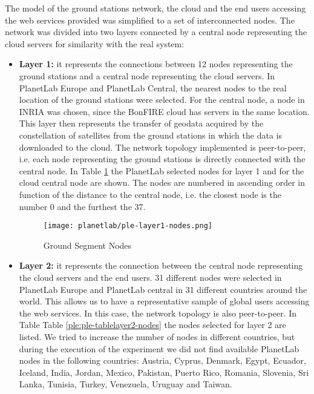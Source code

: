 The model of the ground stations network, the cloud and the end users accessing
the web services provided was simplified to a set of interconnected nodes. The
network was divided into two layers connected by a central node representing the
cloud servers for similarity with the real system: 
\begin{itemize}

\item \textbf{Layer 1:} it represents the connections between 12 nodes
  representing the ground stations and a central node representing the cloud
  servers. In PlanetLab Europe and PlanetLab Central, the nearest nodes to the
  real location of the ground stations were selected. For the central node, a
  node in INRIA was chosen, since the BonFIRE cloud has servers in the same
  location. This layer then represents the transfer of geodata acquired by the
  constellation of satellites from the ground stations in which the data is
  downloaded to the cloud. The network topology implemented is peer-to-peer,
  i.e. each node representing the ground stations is directly connected with the
  central node. In Table \ref{fig:ple-tablelayer1-nodes} the PlanetLab selected nodes for layer 1 and for the
  cloud central node are shown. The nodes are numbered in ascending order in
  function of the distance to the central node, i.e. the closest node is the
  number 0 and the furthest the 37. 

\begin{figure}[!h]
\begin{center}
\texttt{[image: planetlab/ple-layer1-nodes.png]}

\caption{Ground Segment Nodes}
\label{fig:ple-tablelayer1-nodes}
\end{center}
\end{figure}

\item \textbf{Layer 2:} it represents the connection between the central node representing the cloud servers and the end users. 31 different nodes were selected in PlanetLab Europe and PlanetLab central in 31 different countries around the world. This allows us to have a representative sample of global users accessing the web services. In this case, the network topology is also peer-to-peer. In Table Table \ref{ple:ple-tablelayer2-nodes} the nodes selected for layer 2 are listed. We tried to increase the number of nodes in different countries, but during the execution of the experiment we did not find available PlanetLab nodes in the following countries: Austria, Cyprus, Denmark, Egypt, Ecuador, Iceland, India, Jordan, Mexico, Pakistan, Puerto Rico, Romania, Slovenia, Sri Lanka, Tunisia, Turkey, Venezuela, Uruguay and Taiwan. 
\end{itemize}

